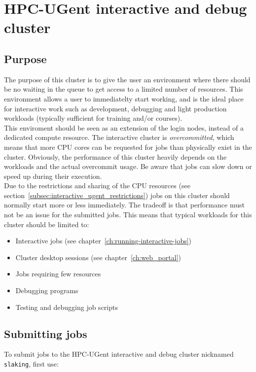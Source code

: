 \chapter{HPC-UGent interactive and debug cluster}
\label{ch:interactive_ugent}


\section{Purpose}
\label{sec:interactive_ugent_pupose}
The purpose of this cluster is to give the user an environment where
there should be no waiting in the queue to get access to a limited
number of resources. This environment allows a user to immediatelty
start working, and is the ideal place for interactive work such as
development, debugging and light production workloads (typically sufficient
for training and/or courses). \\ This enviroment should be seen as an
extension of the login nodes, instead of a dedicated compute resource.
The interactive cluster is \emph{overcommitted}, which means that more CPU cores can be
requested for jobs than physically exist in the cluster. Obviously, the performance of this cluster
heavily depends on the workloads and the actual overcommit usage. Be aware that jobs can slow
down or speed up during their execution.
 \\
Due to the restrictions and sharing of the CPU resources (see section~\ref{subsec:interactive_ugent_restrictions}) 
jobs on this cluster should normally start more or less immediately.
The tradeoff is that performance must not be an issue for the submitted jobs.
This means that typical workloads for this cluster should be limited to:
\begin{itemize}
  \item  Interactive jobs (see chapter~\ref{ch:running-interactive-jobs})
  \item  Cluster desktop sessions (see chapter~\ref{ch:web_portal})
  \item  Jobs requiring few resources
  \item  Debugging programs
  \item  Testing and debugging job scripts
\end{itemize} 

\section{Submitting jobs}
\label{sec:interactive_ugent_jobs}

To submit jobs to the HPC-UGent interactive and debug cluster nicknamed \lstinline|slaking|, first use:

